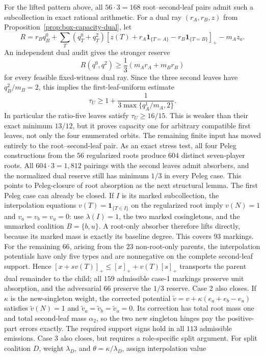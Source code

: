 \documentclass[11pt]{article}
\begin{document}
For the lifted pattern above, all $56\cdot3=168$ root--second-leaf pairs
admit such a subcollection in exact rational arithmetic.  For a dual ray
$(r_A,r_B,z)$ from Proposition~\ref{prop:box-capacity-dual}, let
\[
 R=r_Bq^0_B+\sum_T(q^0_T+q^2_T)
 [z(T)+r_A\mathbf1_{\{T=A\}}-r_B\mathbf1_{\{T=B\}}]_+-m_Az_a.
\]
An independent dual audit gives the stronger reserve
\[
 R(q^0,q^2)\ge\frac13(m_Ar_A+m_Br_B)
\]
for every feasible fixed-witness dual ray.  Since the three second leaves
have $q^2_B/m_B=2$, this implies the first-leaf-uniform estimate
\[
 \tau_U\ge 1+\frac{1}{3\max\{q^1_A/m_A,2\}}.
\]
In particular the ratio-five leaves satisfy $\tau_U\ge16/15$.  This is
weaker than their exact minimum $13/12$, but it proves capacity one for
arbitrary compatible first leaves, not only the four enumerated orbits.  The
remaining finite input has moved entirely to the root--second-leaf pair.
As an exact stress test, all four Peleg constructions from the $56$
regularized roots produce $604$ distinct seven-player roots.  All
$604\cdot3=1{,}812$ pairings with the second leaves admit absorbers, and the
normalized dual reserve still has minimum $1/3$ in every Peleg case.  This
points to Peleg-closure of root absorption as the next structural lemma.
The first Peleg case can already be closed.  If $I$ is its marked
subcollection, the interpolation equations
$v(T)=\mathbf1_{\{T\in I\}}$ on the regularized root imply
$v(N)=1$ and $v_a=v_b=v_u=0$: use $\lambda(I)=1$, the two marked
cosingletons, and the unmarked coalition $B=\{b,u\}$.  A root-only absorber
therefore lifts directly, because its marked mass is exactly its baseline
degree.  This covers $93$ markings.  For the remaining $66$, arising from
the $23$ non-root-only parents, the interpolation potentials have only five
types and are nonnegative on the complete second-leaf support.  Hence
$[x+sv(T)]_+\le[x]_++v(T)[s]_+$ transports the parent dual remainder to the
child; all $159$ admissible case-1 markings preserve unit absorption, and the
adversarial $66$ preserve the $1/3$ reserve.  Case 2 also closes.  If
$\kappa$ is the new-singleton weight, the corrected potential
$\widetilde v=v+\kappa(e_a+e_b-e_u)$ satisfies
$\widetilde v(N)=1$ and
$\widetilde v_a=\widetilde v_b=\widetilde v_u=0$.  Its correction has total
root mass one and total second-leaf mass $\alpha_2$, so the two new singleton
hinges pay the positive-part errors exactly.  The required support signs hold
in all $113$ admissible emissions.  Case 3 also closes, but requires a
role-specific split argument.  For split coalition $D$, weight
$\lambda_D$, and $\theta=\kappa/\lambda_D$, assign interpolation value
\end{document}
